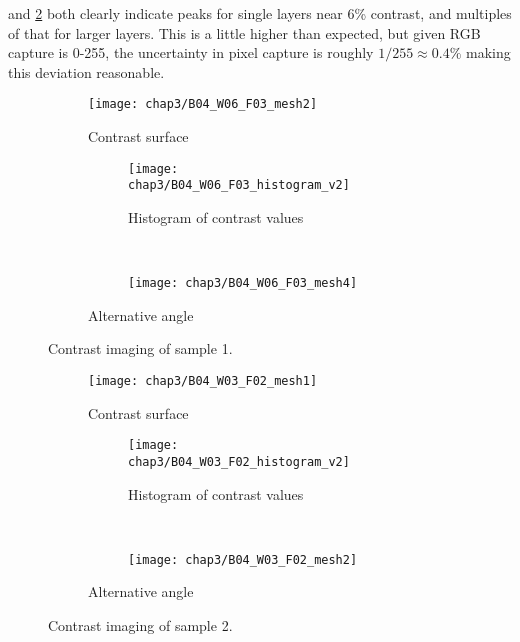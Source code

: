 \documentclass[../Matt_Gebert_Honours_Thesis.tex]{subfiles}
\begin{document}
 and \cref{fig:contrast2} both clearly indicate peaks for single layers near 6\% contrast, and multiples of that for larger layers. This is a little higher than expected, but given RGB capture is 0-255, the uncertainty in pixel capture is roughly $1/255 \approx 0.4\%$ making this deviation reasonable.
\begin{figure}[H]
	\centering
	\begin{subfigure}[b]{0.6\textwidth}
		\texttt{[image: chap3/B04\_W06\_F03\_mesh2]}
		\caption{Contrast surface}
	\end{subfigure}
	\begin{subfigure}[b]{0.35\textwidth}
		\centering
		\begin{subfigure}{\textwidth}
			\texttt{[image: chap3/B04\_W06\_F03\_histogram\_v2]}
			\caption{Histogram of contrast values}
		\end{subfigure}\\
		\begin{subfigure}{\textwidth}
			\centering
			\texttt{[image: chap3/B04\_W06\_F03\_mesh4]}
		\end{subfigure}
		\caption{Alternative angle}
	\end{subfigure}
	\caption[Contrast imaging sample 1]{Contrast imaging of sample 1.}\label{fig:contrast1}
\end{figure}
\begin{figure}[H]
	\centering
	\begin{subfigure}[b]{0.6\textwidth}
		\texttt{[image: chap3/B04\_W03\_F02\_mesh1]}
		\caption{Contrast surface}
	\end{subfigure}
	\begin{subfigure}[b]{0.35\textwidth}
		\centering
		\begin{subfigure}{\textwidth}
			\texttt{[image: chap3/B04\_W03\_F02\_histogram\_v2]}
			\caption{Histogram of contrast values}
		\end{subfigure}\\
		\begin{subfigure}{\textwidth}
			\centering
			\texttt{[image: chap3/B04\_W03\_F02\_mesh2]}
		\end{subfigure}
		\caption{Alternative angle}
	\end{subfigure}
	\caption[Contrast imaging sample 2]{Contrast imaging of sample 2.}\label{fig:contrast2}
\end{figure}


\end{document}
